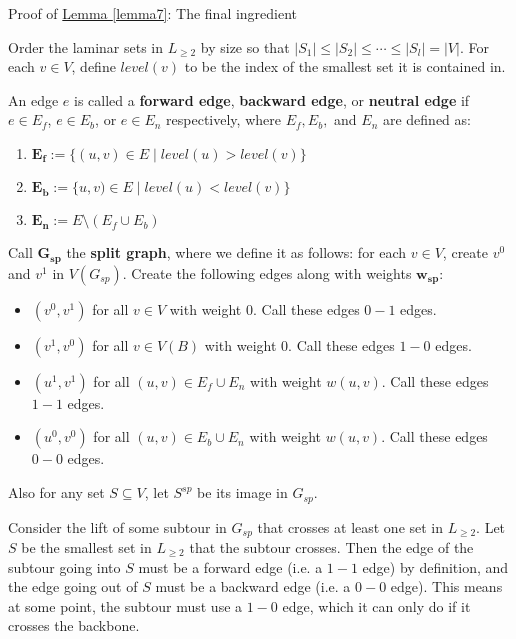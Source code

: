 \documentclass[./main.tex]{subfiles}
\begin{document}
	\begin{subsection}{Proof of \hyperref[lemma7]{Lemma \ref{lemma7}}: The final ingredient}

		Order the laminar sets in $L_{\geq 2}$ by size so that $|S_1|\leq |S_2|\leq\cdots\leq |S_l| = |V|$. For each $v\in V$, define $level(v)$ to be the index of the smallest set it is contained in.\vspace{2mm}
		\begin{definition}
			An edge $e$ is called a \textbf{forward edge}, \textbf{backward edge}, or \textbf{neutral edge} if $e\in E_f$, $e\in E_b$, or $e\in E_n$ respectively, where $E_f, E_b,$ and $E_n$ are defined as:
			\begin{enumerate}[$-$]
				\item $\bm{E_f}:=\{(u,v)\in E\mid level(u) > level(v)\}$
				\item $\bm{E_b}:=\{u,v)\in E\mid level(u) < level(v)\}$
				\item $\bm{E_n}:=E\setminus (E_f\cup E_b)$
			\end{enumerate}
		\end{definition}
		\vspace{2mm}\pagebreak[2]
		\begin{definition}
			Call $\bm{G_{sp}}$ the \textbf{split graph}, where we define it as follows: for each $v\in V$, create $v^0$ and $v^1$ in $V(G_{sp})$. Create the following edges along with weights $\bm{w_{sp}}$:
			\begin{itemize}[$-$]
				\item $(v^0, v^1)$ for all $v\in V$ with weight $0$. Call these edges $0-1$ edges.
				\item $(v^1, v^0)$ for all $v\in V(B)$ with weight $0$. Call these edges $1-0$ edges.
				\item $(u^1, v^1)$ for all $(u,v)\in E_f\cup E_n$ with weight $w(u,v)$. Call these edges $1-1$ edges.
				\item $(u^0, v^0)$ for all $(u,v)\in E_b\cup E_n$ with weight $w(u,v)$. Call these edges $0-0$ edges.
			\end{itemize}
			Also for any set $S\subseteq V$, let $S^{sp}$ be its image in $G_{sp}$.
		\end{definition}\vspace{2mm}
		Consider the lift of some subtour in $G_{sp}$ that crosses at least one set in $L_{\geq 2}$. Let $S$ be the smallest set in $L_{\geq 2}$ that the subtour crosses. 
		Then the edge of the subtour going into $S$ must be a forward edge (i.e. a $1-1$ edge) by definition, and the edge going out of $S$ must be a backward edge (i.e. a $0-0$ edge). This means at some point, the subtour must use a $1-0$ edge, which it can only do if it crosses the backbone.\vspace{1mm}

\end{subsection}
\end{document}
